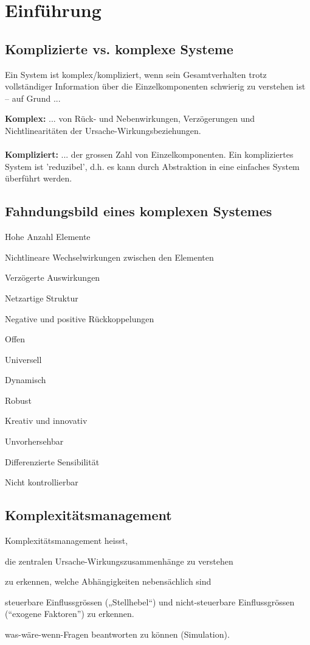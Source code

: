 \section{Einführung}
\subsection{Komplizierte vs. komplexe Systeme}
Ein System ist komplex/kompliziert, wenn sein Gesamtverhalten trotz vollständiger Information über die Einzelkomponenten schwierig zu verstehen ist – auf Grund ...
\begin{multicols}{2}
	\textbf{Komplex:} ... von Rück- und Nebenwirkungen, Verzögerungen und Nichtlinearitäten der Ursache-Wirkungsbeziehungen. \\ \ \\
	\textbf{Kompliziert:} ... der grossen Zahl von Einzelkomponenten. Ein kompliziertes System ist 'reduzibel', d.h. es kann durch Abstraktion in eine einfaches System überführt werden.
\end{multicols}

\subsection{Fahndungsbild eines komplexen Systemes}
\begin{multicols}{3}
	\begin{compactitem}
		\item Hohe Anzahl Elemente
		\item Nichtlineare Wechselwirkungen zwischen den Elementen
		\item Verzögerte Auswirkungen		
		\item Netzartige Struktur
		\item Negative und positive Rückkoppelungen
		\item Offen
		\item Universell
		\item Dynamisch
		\item Robust
		\item Kreativ und innovativ
		\item Unvorhersehbar
		\item Differenzierte Sensibilität
		\item Nicht kontrollierbar
	\end{compactitem}
\end{multicols}

\subsection{Komplexitätsmanagement}
Komplexitätsmanagement heisst,
\begin{compactitem}
	\item die zentralen Ursache-Wirkungszusammenhänge zu verstehen
	\item zu erkennen, welche Abhängigkeiten nebensächlich sind
	\item steuerbare Einflussgrössen („Stellhebel“) und nicht-steuerbare Einflussgrössen (``exogene Faktoren'') zu erkennen.
	\item was-wäre-wenn-Fragen beantworten zu können (Simulation).
\end{compactitem}